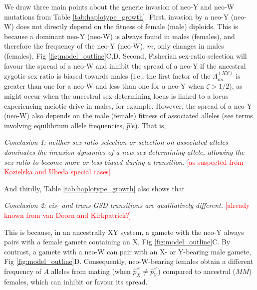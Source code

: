 \documentclass[10pt,letterpaper]{article}
\begin{document}
We draw three main points about the generic invasion of neo-Y and neo-W mutations from Table \ref{tab:haplotype_growth}.
First, invasion by a neo-Y (neo-W) does not directly depend on the fitness of female (male) diploids. %
This is because a dominant neo-Y (neo-W) is always found in males (females), and therefore the frequency of the neo-Y (neo-W), $m$, only changes in males (females), Fig \ref{fig:model_outline}C,D.
Second, Fisherian sex-ratio selection will favour the spread of a neo-W and inhibit the spread of a neo-Y if the ancestral zygotic sex ratio is biased towards males (i.e., the first factor of the $\Lambda_{mi}^{(XY)}$ is greater than one for a neo-W and less than one for a neo-Y when $\zeta>1/2$), as might occur when the ancestral sex-determining locus is linked to a locus experiencing meiotic drive in males, for example.
However, the spread of a neo-Y (neo-W) also depends on the male (female) fitness of associated alleles (see terms involving equilibrium allele frequencies, $\hat{p}$'s). That is, 
\vspace{0.5cm}

\noindent\textit{Conclusion 1:} 
\textit{neither sex-ratio selection or selection on associated alleles dominates the invasion dynamics of a new sex-determining allele, allowing the sex ratio to become more or less biased during a transition.}
\textcolor{red}{[as suspected from Kozielska and Ubeda special cases]}
\vspace{0.5cm}

\noindent And thirdly, Table \ref{tab:haplotype_growth} also shows that
\vspace{0.5cm}

\noindent\textit{Conclusion 2: cis- and trans-GSD transitions are qualitatively different.}
\textcolor{red}{[already known from van Doorn and Kirkpatrick?]}
\vspace{0.5cm}

\noindent This is because, in an ancestrally XY system, a gamete with the neo-Y always pairs with a female gamete containing an X, Fig \ref{fig:model_outline}C.
By contrast, a gamete with a neo-W can pair with an X- or Y-bearing male gamete, Fig \ref{fig:model_outline}D.
Consequently, neo-W-bearing females obtain a different frequency of $A$ alleles from mating (when $\hat{p}_X^\male \neq \hat{p}_Y^\male$) compared to ancestral ($MM$) females, which can inhibit or favour its spread.
\end{document}
